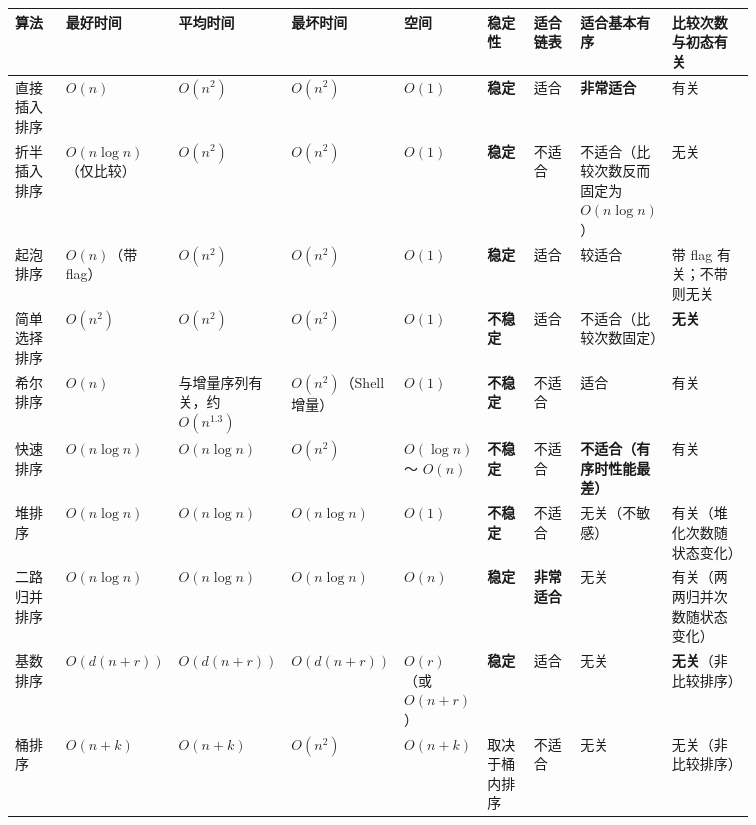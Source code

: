 \documentclass[11pt,openany,UTF8]{ctexbook}
\begin{document}
\begingroup\footnotesize\setlength{\tabcolsep}{3.0pt}
\begin{longtable}{@{}L{0.0906\linewidth}L{0.0830\linewidth}L{0.0830\linewidth}L{0.0830\linewidth}L{0.0830\linewidth}L{0.0830\linewidth}L{0.0830\linewidth}L{0.1245\linewidth}L{0.1509\linewidth}@{}}
\toprule
\textbf{算法} & \textbf{最好时间} & \textbf{平均时间} & \textbf{最坏时间} & \textbf{空间} & \textbf{稳定性} & \textbf{适合链表} & \textbf{适合基本有序} & \textbf{比较次数与初态有关} \\
\midrule
\endhead
直接插入排序 & $O(n)$ & $O(n^2)$ & $O(n^2)$ & $O(1)$ & \textbf{稳定} & 适合 & \textbf{非常适合} & 有关 \\
折半插入排序 & $O(n\log n)$（仅比较） & $O(n^2)$ & $O(n^2)$ & $O(1)$ & \textbf{稳定} & 不适合 & 不适合（比较次数反而固定为 $O(n\log n)$） & 无关 \\
起泡排序 & $O(n)$（带 flag） & $O(n^2)$ & $O(n^2)$ & $O(1)$ & \textbf{稳定} & 适合 & 较适合 & 带 flag 有关；不带则无关 \\
简单选择排序 & $O(n^2)$ & $O(n^2)$ & $O(n^2)$ & $O(1)$ & \textbf{不稳定} & 适合 & 不适合（比较次数固定） & \textbf{无关} \\
希尔排序 & $O(n)$ & 与增量序列有关，约 $O(n^{1.3})$ & $O(n^2)$（Shell 增量） & $O(1)$ & \textbf{不稳定} & 不适合 & 适合 & 有关 \\
快速排序 & $O(n\log n)$ & $O(n\log n)$ & $O(n^2)$ & $O(\log n)$ ～ $O(n)$ & \textbf{不稳定} & 不适合 & \textbf{不适合（有序时性能最差）} & 有关 \\
堆排序 & $O(n\log n)$ & $O(n\log n)$ & $O(n\log n)$ & $O(1)$ & \textbf{不稳定} & 不适合 & 无关（不敏感） & 有关（堆化次数随状态变化） \\
二路归并排序 & $O(n\log n)$ & $O(n\log n)$ & $O(n\log n)$ & $O(n)$ & \textbf{稳定} & \textbf{非常适合} & 无关 & 有关（两两归并次数随状态变化） \\
基数排序 & $O(d(n+r))$ & $O(d(n+r))$ & $O(d(n+r))$ & $O(r)$（或 $O(n+r)$） & \textbf{稳定} & 适合 & 无关 & \textbf{无关}（非比较排序） \\
桶排序 & $O(n+k)$ & $O(n+k)$ & $O(n^2)$ & $O(n+k)$ & 取决于桶内排序 & 不适合 & 无关 & 无关（非比较排序） \\
\bottomrule
\end{longtable}
\endgroup
\end{document}
